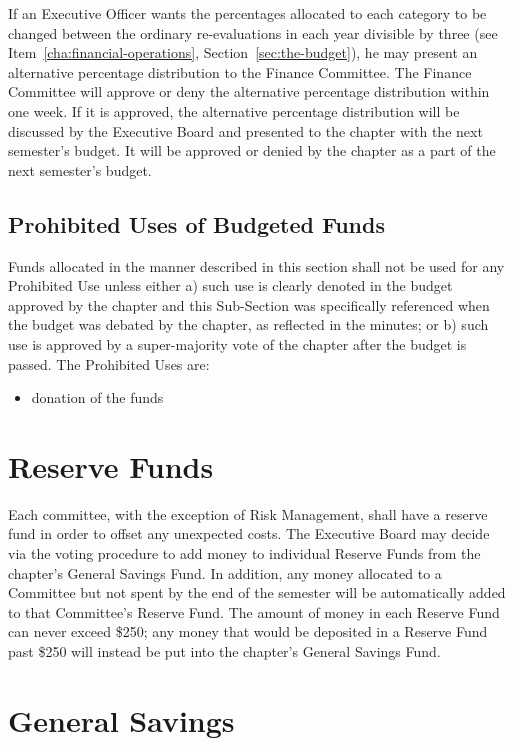 If an Executive Officer wants the percentages allocated to each category to be
changed between the ordinary re-evaluations in each year divisible by three
(see Item~\ref{cha:financial-operations}, Section~\ref{sec:the-budget}), he may
present an alternative percentage distribution to the Finance Committee.
The Finance Committee will approve or deny the alternative percentage
distribution within one week.
If it is approved, the alternative percentage distribution will be discussed by
the Executive Board and presented to the chapter with the next semester’s
budget.
It will be approved or denied by the chapter as a part of the next semester’s
budget.

\subsection{Prohibited Uses of Budgeted Funds}

Funds allocated in the manner described in this section shall not be used for
any Prohibited Use unless either a) such use is clearly denoted in the budget
approved by the chapter and this Sub-Section was specifically referenced when
the budget was debated by the chapter, as reflected in the minutes; or b) such
use is approved by a super-majority vote of the chapter after the budget is
passed.
The Prohibited Uses are: 
\begin{itemize}
    \item donation of the funds
\end{itemize}

\section{Reserve Funds}

Each committee, with the exception of Risk Management, shall have a reserve
fund in order to offset any unexpected costs.
The Executive Board may decide via the voting procedure to add money to
individual Reserve Funds from the chapter’s General Savings Fund.
In addition, any money allocated to a Committee but not spent by the end of the
semester will be automatically added to that Committee’s Reserve Fund.
The amount of money in each Reserve Fund can never exceed \$250; any money that
would be deposited in a Reserve Fund past \$250 will instead be put into the
chapter’s General Savings Fund.

\section{General Savings}

